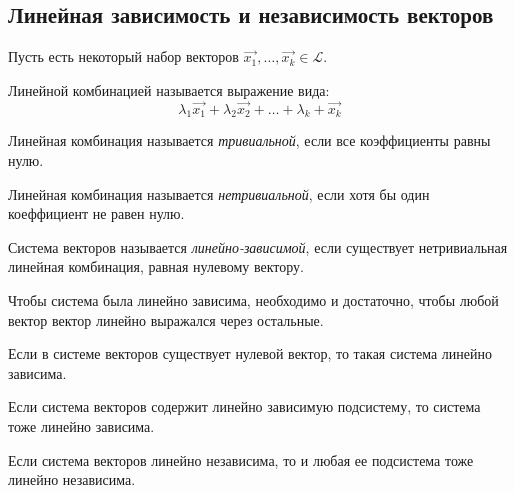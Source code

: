 \subsection{Линейная зависимость и независимость векторов}

Пусть есть некоторый набор векторов $\vec{x_1}, \ldots, \vec{x_k} \in \mathcal{L}$.

\begin{definition}
    Линейной комбинацией называется выражение вида: \[
        \lambda_1 \vec{x_1} + \lambda_2 \vec{x_2} + \ldots + \lambda_k + \vec{x_k}
    \]
\end{definition}

\begin{definition}
    Линейная комбинация называется \textit{тривиальной}, если все коэффициенты равны нулю.
\end{definition}

\begin{definition}
    Линейная комбинация называется \textit{нетривиальной}, если хотя бы один коеффициент не равен нулю.
\end{definition}

\begin{definition}
    Система векторов называется \textit{линейно-зависимой}, если существует нетривиальная линейная комбинация, равная нулевому вектору. 
\end{definition}

\begin{theorem}
    Чтобы система была линейно зависима, необходимо и достаточно, чтобы любой вектор вектор линейно выражался через остальные.
\end{theorem}

\begin{property}
    Если в системе векторов существует нулевой вектор, то такая система линейно зависима.
\end{property}

\begin{property}
    Если система векторов содержит линейно зависимую подсистему, то система тоже линейно зависима.
\end{property}

\begin{property}
    Если система векторов линейно независима, то и любая ее подсистема тоже линейно независима.
\end{property}

